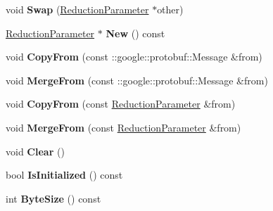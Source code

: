\begin{DoxyCompactItemize}
void {\bfseries Swap} (\mbox{\hyperlink{classcaffe_1_1_reduction_parameter}{Reduction\+Parameter}} $\ast$other)
\item 
\mbox{\label{classcaffe_1_1_reduction_parameter_ac7766e17b1e6ee90001e613b4a34f72b}} 
\mbox{\hyperlink{classcaffe_1_1_reduction_parameter}{Reduction\+Parameter}} $\ast$ {\bfseries New} () const
\item 
\mbox{\label{classcaffe_1_1_reduction_parameter_ae54600eb913d4d37a194d8531723f0c1}} 
void {\bfseries Copy\+From} (const \+::google\+::protobuf\+::\+Message \&from)
\item 
\mbox{\label{classcaffe_1_1_reduction_parameter_ac64d4753d4e87e414229658d6ea0e1e4}} 
void {\bfseries Merge\+From} (const \+::google\+::protobuf\+::\+Message \&from)
\item 
\mbox{\label{classcaffe_1_1_reduction_parameter_a3f0955ffdde171028ebee3a9571f22fb}} 
void {\bfseries Copy\+From} (const \mbox{\hyperlink{classcaffe_1_1_reduction_parameter}{Reduction\+Parameter}} \&from)
\item 
\mbox{\label{classcaffe_1_1_reduction_parameter_a2f471514ab044c53693954e3a0f0d405}} 
void {\bfseries Merge\+From} (const \mbox{\hyperlink{classcaffe_1_1_reduction_parameter}{Reduction\+Parameter}} \&from)
\item 
\mbox{\label{classcaffe_1_1_reduction_parameter_ae810b98be3d49c1d267aec0ce8607e49}} 
void {\bfseries Clear} ()
\item 
\mbox{\label{classcaffe_1_1_reduction_parameter_a91752db5a0e4c7174906cb00c7859f64}} 
bool {\bfseries Is\+Initialized} () const
\item 
\mbox{\label{classcaffe_1_1_reduction_parameter_a29230cc5cbf0acde99f588cb24df14e6}} 
int {\bfseries Byte\+Size} () const
\item 
\mbox{\label{classcaffe_1_1_reduction_parameter_afd1b4a17a372566e7e3468108e2fae32}} 

\end{DoxyCompactItemize}
